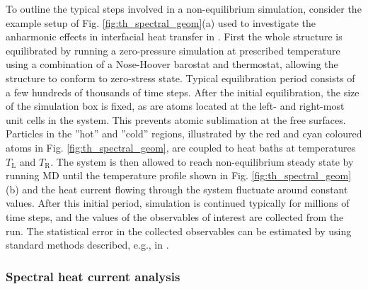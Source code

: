 To outline the typical steps involved in a non-equilibrium simulation, consider the example setup of Fig. \ref{fig:th_spectral_geom}(a) used to investigate the anharmonic effects in interfacial heat transfer in . First the whole structure is equilibrated by running a zero-pressure simulation at prescribed temperature using a combination of a Nose-Hoover barostat and thermostat, allowing the structure to conform to zero-stress state. Typical equilibration period consists of a few hundreds of thousands of time steps. After the initial equilibration, the size of the simulation box is fixed, as are atoms located at the left- and right-most unit cells in the system. This prevents atomic sublimation at the free surfaces. Particles in the ''hot'' and ''cold'' regions, illustrated by the red and cyan coloured atoms in Fig. \ref{fig:th_spectral_geom}, are coupled to heat baths at temperatures $T_{\textrm{L}}$ and $T_{\textrm{R}}$. The system is then allowed to reach non-equilibrium steady state by running MD until the temperature profile shown in Fig. \ref{fig:th_spectral_geom}(b) and the heat current flowing through the system fluctuate around constant values. After this initial period, simulation is continued typically for millions of time steps, and the values of the observables of interest are collected from the run. The statistical error in the collected observables can be estimated by using standard methods described, e.g., in \cite{allentildesley}.


\subsubsection{Spectral heat current analysis}




